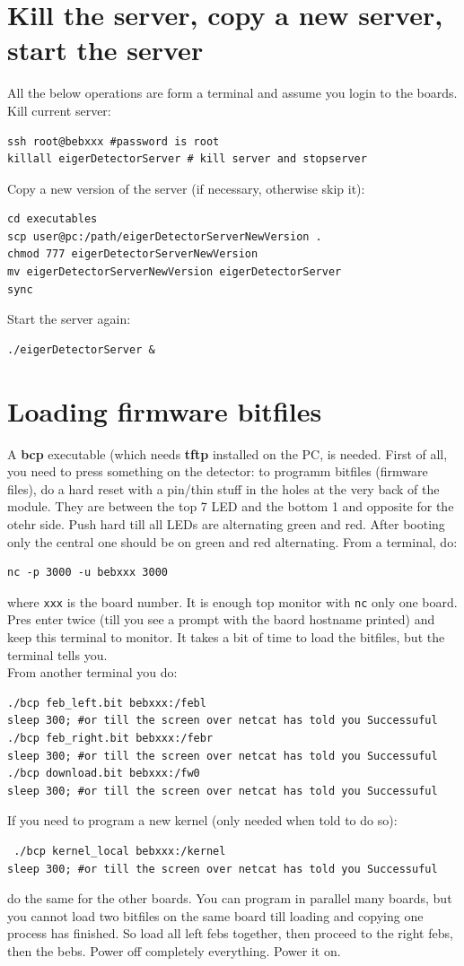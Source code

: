 \documentclass{article}
\begin{document}
\section{Kill the server, copy a new server, start the server}
All the below operations are form a terminal and assume you login to the boards.\\
Kill current server:
\begin{verbatim}
ssh root@bebxxx #password is root
killall eigerDetectorServer # kill server and stopserver
\end{verbatim}
Copy a new version of the server (if necessary, otherwise skip it):
\begin{verbatim}
cd executables
scp user@pc:/path/eigerDetectorServerNewVersion .
chmod 777 eigerDetectorServerNewVersion
mv eigerDetectorServerNewVersion eigerDetectorServer
sync
\end{verbatim}
Start the server again:
\begin{verbatim}
./eigerDetectorServer &
\end{verbatim}


\section{Loading firmware bitfiles}

A \textbf{bcp} executable (which needs \textbf{tftp} installed on the PC, is needed. First of all, you need to press something on the detector: to programm bitfiles (firmware files), do a hard reset with a pin/thin stuff in the holes at the very back of the module. They are between the top 7 LED and the bottom 1 and opposite for the otehr side. Push hard till all LEDs are alternating green and red. After booting only the central one should be on green and red alternating. From a terminal, do:
\begin{verbatim}
nc -p 3000 -u bebxxx 3000 
\end{verbatim} 
where {\tt{xxx}} is the board number. It is enough top monitor with {\tt{nc}} only one board. Pres enter twice (till you see a prompt with the baord hostname printed) and keep this terminal to monitor. It takes a bit of time to load the bitfiles, but the terminal tells you.\\
From another terminal you do:
\begin{verbatim}
./bcp feb_left.bit bebxxx:/febl
sleep 300; #or till the screen over netcat has told you Successuful
./bcp feb_right.bit bebxxx:/febr
sleep 300; #or till the screen over netcat has told you Successuful
./bcp download.bit bebxxx:/fw0
sleep 300; #or till the screen over netcat has told you Successuful
\end{verbatim}
If you need to program a new kernel (only needed when told to do so):
\begin{verbatim}
 ./bcp kernel_local bebxxx:/kernel
sleep 300; #or till the screen over netcat has told you Successuful
\end{verbatim}
do the same for the other boards. You can program in parallel many boards, but you cannot load two bitfiles on the same board till loading and copying one process has finished. So load all left febs together, then proceed to the right febs, then the bebs. Power off completely everything. Power it on.
\end{document}

